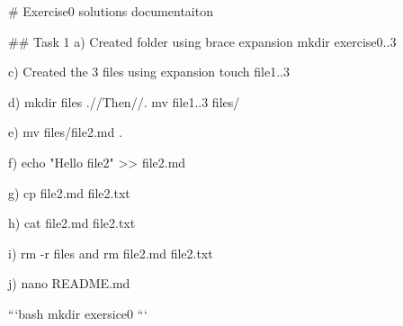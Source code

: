 # Exercise0 solutions documentaiton

## Task 1
a) Created folder using brace expansion
mkdir exercise{0..3}

c) Created the 3 files using expansion
touch file{1..3}

d) mkdir files .//Then//. mv file{1..3} files/

e) mv files/file2.md .

f) echo "Hello file2" >> file2.md

g) cp file2.md file2.txt

h) cat file2.md file2.txt

i) rm -r files and rm file2.md file2.txt


j) nano README.md


```bash
mkdir exersice0
```
